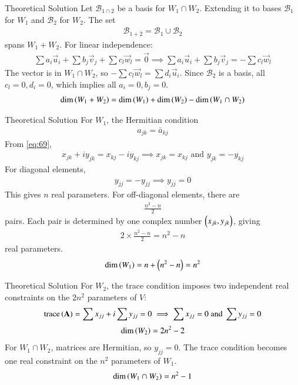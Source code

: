 \documentclass{beamer}
\begin{document}
\begin{frame}{Theoretical Solution}
Let $\mathcal{B}_{1 \cap 2}$ be a basis for $W_1 \cap W_2$. Extending it to bases $\mathcal{B}_1$ for $W_1$ and $\mathcal{B}_2$ for $W_2$. The set 
\begin{align*}
    \mathcal{B}_{1+2} = \mathcal{B}_1 \cup \mathcal{B}_2
\end{align*}
spans $W_1+W_2$. For linear independence:
\begin{align}
    \sum a_i \vec{u}_i + \sum b_j \vec{v}_j + \sum c_l \vec{w}_l = \vec{0} \implies \sum a_i \vec{u}_i + \sum b_j \vec{v}_j = - \sum c_l \vec{w}_l
\end{align}
The vector is in $W_1 \cap W_2$, so $-\sum c_l \vec{w}_l = \sum d_i \vec{u}_i$. Since $\mathcal{B}_2$ is a basis, all $c_l=0, d_i=0$, which implies all $a_i=0, b_j=0$.
\begin{align}
    \dim\left(W_1 + W_2\right) = \dim\left(W_1\right) + \dim\left(W_2\right) - \dim\left(W_1 \cap W_2\right)
\end{align}
\end{frame}

\begin{frame}{Theoretical Solution}
For $W_1$, the Hermitian condition 
\begin{align}
    a_{jk} = \bar{a}_{kj} \label{eq:69}
\end{align}
From \eqref{eq:69},
\begin{align}
    x_{jk} + iy_{jk} = x_{kj} - iy_{kj} \implies x_{jk}=x_{kj} \text{ and } y_{jk}=-y_{kj}
\end{align}
For diagonal elements, 
\begin{align}
y_{jj} = -y_{jj} \implies y_{jj} = 0
\end{align}
This gives $n$ real parameters. For off-diagonal elements, there are 
\begin{align}
    \frac{n^2-n}{2}
\end{align}
pairs. Each pair is determined by one complex number $\begin{pmatrix}x_{jk}, y_{jk}\end{pmatrix}$, giving 
\begin{align}
    2 \times \frac{n^2-n}{2} = n^2-n
\end{align}
real parameters.
\begin{align}
    \dim\left(W_1\right) = n + \left(n^2-n\right) = n^2
\end{align}
\end{frame}

\begin{frame}{Theoretical Solution}
For $W_2$, the trace condition imposes two independent real constraints on the $2n^2$ parameters of $V$:
\begin{align}
    \text{trace}\left(\mathbf{A}\right) = \sum x_{jj} + i \sum y_{jj} = 0 \implies \sum x_{jj} = 0 \text{ and } \sum y_{jj} = 0
\end{align}
\begin{align}
    \dim\left(W_2\right) = 2n^2 - 2
\end{align}
For $W_1 \cap W_2$, matrices are Hermitian, so $y_{jj}=0$. The trace condition becomes one real constraint on the $n^2$ parameters of $W_1$.
\begin{align}
    \dim\left(W_1 \cap W_2\right) = n^2 - 1
\end{align}
\end{frame}
\end{document}
